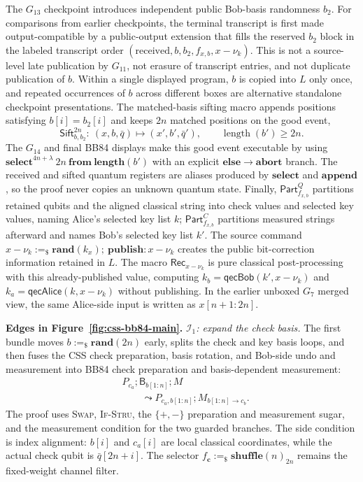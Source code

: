 \documentclass[conference,compsoc]{IEEEtran}
\newcommand{\bb}{\textsf{BB84}\xspace}
\begin{document}
The \(G_{13}\) checkpoint introduces independent public Bob-basis randomness \(b_2\). For comparisons from earlier checkpoints, the terminal transcript is first made output-compatible by a public-output extension that fills the reserved \(b_2\) block in the labeled transcript order \((\mathrm{received},b,b_2,f_{x,b},x-\nu_k)\). This is not a source-level late publication by \(G_{11}\), not erasure of transcript entries, and not duplicate publication of \(b\). Within a single displayed program, \(b\) is copied into \(L\) only once, and repeated occurrences of \(b\) across different boxes are alternative standalone checkpoint presentations. The matched-basis sifting macro appends positions satisfying \(b[i]=b_2[i]\) and keeps \(2n\) matched positions on the good event,
\[
\mathsf{Sift}^{2n}_{b,b_2}:\ (x,b,\bar q)\mapsto(x',b',\bar q'),
\qquad
\operatorname{length}(b')\ge2n .
\]
The \(G_{14}\) and final \bb displays make this good event executable by using \(\mathbf{select}^{4n+\lambda}\ 2n\ \mathbf{from}\ \mathbf{length}(b')\) with an explicit \(\mathbf{else}\rightarrow\mathbf{abort}\) branch. The received and sifted quantum registers are aliases produced by \(\mathbf{select}\) and \(\mathbf{append}\), so the proof never copies an unknown quantum state. Finally, \(\mathsf{Part}^{Q}_{f_{x,b}}\) partitions retained qubits and the aligned classical string into check values and selected key values, naming Alice's selected key list \(k\); \(\mathsf{Part}^{C}_{f_{x,b}}\) partitions measured strings afterward and names Bob's selected key list \(k'\). The source command \(x-\nu_k:=_\$\mathbf{rand}(k_x);\ \mathbf{publish: }x-\nu_k\) creates the public bit-correction information retained in \(L\). The macro \(\mathsf{Rec}_{x-\nu_k}\) is pure classical post-processing with this already-published value, computing \(k_b=\mathsf{qecBob}(k',x-\nu_k)\) and \(k_a=\mathsf{qecAlice}(k,x-\nu_k)\) without publishing. In the earlier unboxed \(G_{7}\) merged view, the same Alice-side input is written as \(x[n+1{:}2n]\).

\smallskip\noindent\textbf{Edges in Figure~\ref{fig:css-bb84-main}.}
\emph{\(\mathcal I_1\): expand the check basis.}
The first bundle moves \(b:=_\$\mathbf{rand}(2n)\) early, splits the check and key basis loops, and then fuses the CSS check preparation, basis rotation, and Bob-side undo and measurement into \bb check preparation and basis-dependent measurement:
\[
\begin{aligned}
&P_{c_a};\mathsf B_{b[1{:}n]};M\\
&\qquad\leadsto
P_{c_a,b[1{:}n]};M_{b[1{:}n]\to c_b}.
\end{aligned}
\]
The proof uses \textsc{Swap}, \textsc{If-Stru}, the \(\{+,-\}\) preparation and measurement sugar, and the measurement condition for the two guarded branches. The side condition is index alignment: \(b[i]\) and \(c_a[i]\) are local classical coordinates, while the actual check qubit is \(\bar q[2n+i]\). The selector \(f_{\mathbf c}:=_\$\mathbf{shuffle}(n)_{2n}\) remains the fixed-weight channel filter.
\end{document}
